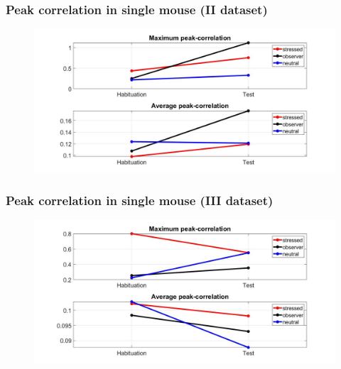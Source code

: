 \documentclass{beamer}
\begin{document}
\begin{frame}
\frametitle{Peak correlation in single mouse (II dataset)}


\begin{figure}[H]
	\begin{center}
		\hspace*{-1.3cm}
		\includegraphics[scale=.30]{peak_corr2.jpg} 
	\end{center}  
	
	
\end{figure}

\end{frame}

\begin{frame}
\frametitle{Peak correlation in single mouse (III dataset)}


\begin{figure}[H]
	\begin{center}
		\hspace*{-1.3cm}
		\includegraphics[scale=.30]{peak_corr3.jpg} 
	\end{center}  
	
	
\end{figure}

\end{frame}
\end{document}
